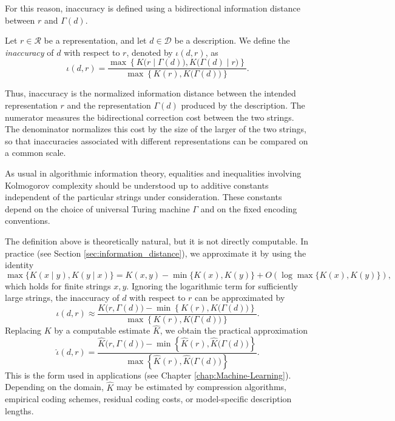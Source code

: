 For this reason, inaccuracy is defined using a bidirectional information distance between $r$ and $\Gamma(d)$.

\begin{definition}[Inaccuracy]
\label{def:inaccuracy:inaccuracy:inaccuracy}
Let $r \in \mathcal{R}$ be a representation, and let $d \in \mathcal D$ be a description. We define the \emph{inaccuracy} of $d$ with respect to $r$, denoted by $\iota(d,r)$, as
\[
\iota(d,r) = \frac{ \max\left\{K\bigl(r\mid \Gamma(d)\bigr), K\bigl(\Gamma(d)\mid r\bigr)\right\} }{
\max\left\{K(r), K\bigl(\Gamma(d)\bigr) \right\}}.
\]
\end{definition}

Thus, inaccuracy is the normalized information distance between the intended representation $r$ and the representation $\Gamma(d)$ produced by the description. The numerator measures the bidirectional correction cost between the two strings. The denominator normalizes this cost by the size of the larger of the two strings, so that inaccuracies associated with different representations can be compared on a common scale.

As usual in algorithmic information theory, equalities and inequalities involving Kolmogorov complexity should be understood up to additive constants independent of the particular strings under consideration. These constants depend on the choice of universal Turing machine $\Gamma$ and on the fixed encoding conventions.

The definition above is theoretically natural, but it is not directly computable. In practice (see Section \ref{sec:information_distance}), we approximate it by using the identity
\[
\max\{K(x\mid y),K(y\mid x)\} = K(x,y)-\min\{K(x),K(y)\} + O(\log \max\{K(x),K(y)\}),
\]
which holds for finite strings $x, y$. Ignoring the logarithmic term for sufficiently large strings, the inaccuracy of $d$ with respect to $r$ can be approximated by
\[
\iota(d,r) \approx \frac{ K\bigl(r,\Gamma(d)\bigr) - \min\left\{ K(r), K\bigl(\Gamma(d)\bigr) \right\} }{
\max\left\{K(r), K\bigl(\Gamma(d)\bigr) \right\}}.
\]
Replacing $K$ by a computable estimate $\hat K$, we obtain the practical approximation
\[
\hat{\iota}(d,r) = \frac{\hat K\bigl(r, \Gamma(d)\bigr) - \min\left\{\hat K(r), \hat K\bigl(\Gamma(d)\bigr) \right\} }{
\max\left\{ \hat K(r), \hat K\bigl(\Gamma(d)\bigr) \right\}}.
\]
This is the form used in applications (see Chapter \ref{chap:Machine-Learning}). Depending on the domain, $\hat K$ may be estimated by compression algorithms, empirical coding schemes, residual coding costs, or model-specific description lengths.

